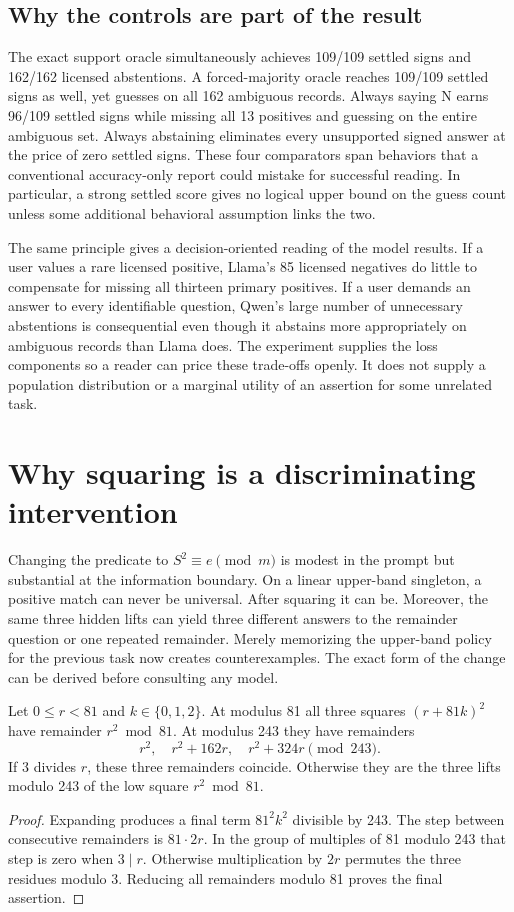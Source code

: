 \documentclass[12pt,letterpaper]{article}
\begin{document}
\subsection{Why the controls are part of the result}
The exact support oracle simultaneously achieves 109/109 settled signs and 162/162 licensed abstentions. A forced-majority oracle reaches 109/109 settled signs as well, yet guesses on all 162 ambiguous records. Always saying N earns 96/109 settled signs while missing all 13 positives and guessing on the entire ambiguous set. Always abstaining eliminates every unsupported signed answer at the price of zero settled signs. These four comparators span behaviors that a conventional accuracy-only report could mistake for successful reading. In particular, a strong settled score gives no logical upper bound on the guess count unless some additional behavioral assumption links the two.

The same principle gives a decision-oriented reading of the model results. If a user values a rare licensed positive, Llama's 85 licensed negatives do little to compensate for missing all thirteen primary positives. If a user demands an answer to every identifiable question, Qwen's large number of unnecessary abstentions is consequential even though it abstains more appropriately on ambiguous records than Llama does. The experiment supplies the loss components so a reader can price these trade-offs openly. It does not supply a population distribution or a marginal utility of an assertion for some unrelated task.

\section{Why squaring is a discriminating intervention}\label{sec:square}
Changing the predicate to $S^2\equiv e\pmod m$ is modest in the prompt but substantial at the information boundary. On a linear upper-band singleton, a positive match can never be universal. After squaring it can be. Moreover, the same three hidden lifts can yield three different answers to the remainder question or one repeated remainder. Merely memorizing the upper-band policy for the previous task now creates counterexamples. The exact form of the change can be derived before consulting any model.

\begin{lemma}\label{lem:lift}
Let $0\le r<81$ and $k\in\{0,1,2\}$. At modulus 81 all three squares $(r+81k)^2$ have remainder $r^2\bmod81$. At modulus 243 they have remainders
\[
 r^2,\quad r^2+162r,\quad r^2+324r\pmod{243}.
\]
If $3$ divides $r$, these three remainders coincide. Otherwise they are the three lifts modulo 243 of the low square $r^2\bmod81$.
\end{lemma}
\begin{proof}
Expanding produces a final term $81^2k^2$ divisible by 243. The step between consecutive remainders is $81\cdot 2r$. In the group of multiples of 81 modulo 243 that step is zero when $3\mid r$. Otherwise multiplication by $2r$ permutes the three residues modulo 3. Reducing all remainders modulo 81 proves the final assertion.
\end{proof}
\end{document}
